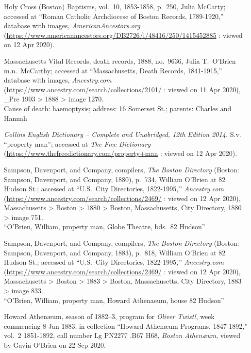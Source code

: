 \begin{thebibliography}{999}
Holy Cross (Boston) Baptisms, vol.\ 10, 1853-1858, p.\ 250, Julia McCarty; accessed at ``Roman Catholic Archdiocese of Boston Records, 1789-1920,'' database with images, \textit{AmericanAncestors.org} (\url{https://www.americanancestors.org/DB2726/i/48416/250/1415452885} : viewed on 12 Apr 2020).

Massachusetts Vital Records, death records, 1888, no.\ 9636, Julia T.\ O'Brien m.n.\ McCarthy; accessed at ``Massachusetts, Death Records, 1841-1915,'' database with images, \textit{Ancestry.com} (\url{https://www.ancestry.com/search/collections/2101/} : viewed on 11 Apr 2020), \_Pre 1903 > 1888 > image 1270.\\
Cause of death: haemoptysis; address: 16 Somerset St.; parents: Charles and Hannah

\textit{Collins English Dictionary -- Complete and Unabridged, 12th Edition 2014.} S.v. ``property man''; accessed at \textit{The Free Dictionary} (\url{https://www.thefreedictionary.com/property+man} : viewed on 12 Apr 2020).

Sampson, Davenport, and Company, compilers, \textit{The Boston Directory} (Boston: Sampson, Davenport, and Company, 1880), p.\ 734, William O'Brien at 82 Hudson St.; accessed at ``U.S.\ City Directories, 1822-1995,’’ \textit{Ancestry.com} (\url{https://www.ancestry.com/search/collections/2469/} : viewed on 12 Apr 2020), Massachusetts > Boston > 1880 > Boston, Massachusetts, City Directory, 1880 > image 751.\\
``O'Brien, William, property man, Globe Theatre, bds.\ 82 Hudson''

Sampson, Davenport, and Company, compilers, \textit{The Boston Directory} (Boston: Sampson, Davenport, and Company, 1883), p.\ 818, William O'Brien at 82 Hudson St.; accessed at ``U.S.\ City Directories, 1822-1995,’’ \textit{Ancestry.com} (\url{https://www.ancestry.com/search/collections/2469/} : viewed on 12 Apr 2020), Massachusetts > Boston > 1883 > Boston, Massachusetts, City Directory, 1883 > image 833.\\
``O'Brien, William, property man, Howard Athenaeum, house 82 Hudson''

Howard Athen\ae um, season of 1882--3, program for \textit{Oliver Twist!}, week commencing 8 Jan 1883; in collection ``Howard Athen\ae um Programs, 1847-1892,'' vol.\ 2 1851-1892, call number Lg PN2277 .B67 H68, \textit{Boston Athen\ae um}, viewed by Gavin O'Brien on 22 Sep 2020.


\end{thebibliography}
